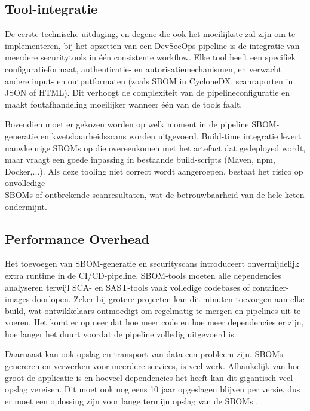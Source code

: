 \subsection{Tool-integratie}

De eerste technische uitdaging, en degene die ook het moeilijkste zal zijn om te implementeren, bij het opzetten van een DevSecOps-pipeline is de integratie van meerdere securitytools in één consistente workflow. Elke tool heeft een specifiek configuratieformaat, authenticatie- en autorisatiemechanismen, en verwacht andere input- en outputformaten (zoals SBOM in CycloneDX, scanraporten in JSON of HTML). Dit verhoogt de complexiteit van de pipelineconfiguratie en maakt foutafhandeling moeilijker wanneer één van de tools faalt.

Bovendien moet er gekozen worden op welk moment in de pipeline SBOM-\\generatie en kwetsbaarheidsscans worden uitgevoerd. Build-time integratie levert nauwkeurige SBOMs op die overeenkomen met het artefact dat gedeployed wordt, maar vraagt een goede inpassing in bestaande build-scripts (Maven, npm, Docker,...). Als deze tooling niet correct wordt aangeroepen, bestaat het risico op onvolledige\\SBOMs of ontbrekende scanresultaten, wat de betrouwbaarheid van de hele keten ondermijnt.

\subsection{Performance Overhead}

Het toevoegen van SBOM-generatie en securityscans introduceert onvermijdelijk extra runtime in de CI/CD-pipeline. SBOM-tools moeten alle dependencies analyseren terwijl SCA- en SAST-tools vaak volledige codebases of container-images doorlopen. Zeker bij grotere projecten kan dit minuten toevoegen aan elke build, wat ontwikkelaars ontmoedigt om regelmatig te mergen en pipelines uit te voeren. Het komt er op neer dat hoe meer code en hoe meer dependencies er zijn, hoe langer het duurt voordat de pipeline volledig uitgevoerd is.

Daarnaast kan ook opslag en transport van data een probleem zijn. SBOMs genereren en verwerken voor meerdere services, is veel werk. Afhankelijk van hoe groot de applicatie is en hoeveel dependencies het heeft kan dit gigantisch veel opslag vereisen. Dit moet ook nog eens 10 jaar opgeslagen blijven per versie, dus er moet een oplossing zijn voor lange termijn opslag van de SBOMs \autocite{CRAEvidenceSBOM}.

